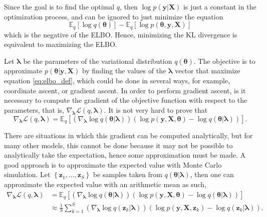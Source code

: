 Since the goal is to find the optimal $q$, then $\log p(\boldsymbol{y} | \boldsymbol{X})$ is just a constant in the optimization process, and can be ignored to just minimize the equation
\begin{equation}
  \mathbb{E}_q \left[ \log  q(\boldsymbol{\theta}) \right] - \mathbb{E}_q \left[ \log p(\boldsymbol{\theta}, \boldsymbol{y}, \boldsymbol{X}) \right]
\end{equation}
which is the negative of the ELBO. Hence, minimizing the KL divergence is equivalent to maximizing the ELBO.

Let $\boldsymbol{\lambda}$ be the parameters of the variational distribution $q(\boldsymbol{\theta})$. The objective is to approximate $p(\boldsymbol{\theta} | \boldsymbol{y}, \boldsymbol{X})$ by finding the values of the $\boldsymbol{\lambda}$ vector that maximize equation \eqref{eq:elbo_def}, which could be done in several ways, for example, coordinate ascent, or gradient ascent. In order to perform gradient ascent, is it necessary to compute the gradient of the objective function with respect to the parameters, that is, $\nabla_{\boldsymbol{\lambda}} \mathcal{L}(q, \boldsymbol{\lambda})$. It is not very hard to prove that
\begin{equation}
  \label{eq:ELBO_gradient}
  \nabla_{\boldsymbol{\lambda}} \mathcal{L}(q, \boldsymbol{\lambda}) =
  \mathbb{E}_q \left[ \left( \nabla_{\boldsymbol{\lambda}} \log q(\boldsymbol{\theta} | \boldsymbol{\lambda}) \right) \left( \log p(\boldsymbol{y}, \boldsymbol{X}, \boldsymbol{\theta}) - \log q(\boldsymbol{\theta} | \boldsymbol{\lambda}) \right) \right].
\end{equation}

There are situations in which this gradient can be computed analytically, but for many other models, this cannot be done because it may not be possible to analytically take the expectation, hence some approximation must be made. A good approach is to approximate the expected value with Monte Carlo simulation. Let $\left\{ \boldsymbol{z}_1, ..., \boldsymbol{z}_S \right\}$ be samples taken from $q(\boldsymbol{\theta} | \boldsymbol{\lambda})$, then one can approximate the expected value with an arithmetic mean as such,
\begin{equation}
  \begin{split}
  \nabla_{\boldsymbol{\lambda}} \mathcal{L}(q, \boldsymbol{\lambda}) &=
  \mathbb{E}_q \left[ \left( \nabla_{\boldsymbol{\lambda}} \log q(\boldsymbol{\theta} | \boldsymbol{\lambda}) \right) \left( \log p(\boldsymbol{y}, \boldsymbol{X}, \boldsymbol{\theta}) - \log q(\boldsymbol{\theta} | \boldsymbol{\lambda}) \right) \right] \\
  & \approx \frac{1}{S} \sum_{k = 1}^S \left( \nabla_{\boldsymbol{\lambda}} \log q(\boldsymbol{z}_k | \boldsymbol{\lambda}) \right) \left( \log p(\boldsymbol{y}, \boldsymbol{X}, \boldsymbol{z}_k) - \log q(\boldsymbol{z}_k | \boldsymbol{\lambda}) \right).
  \end{split}
\end{equation}

